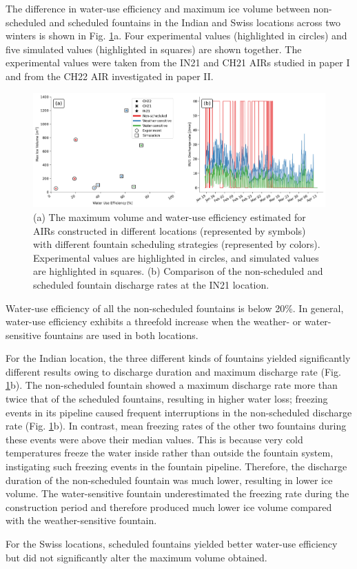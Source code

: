 The difference in water-use efficiency and maximum ice volume between non-scheduled and scheduled fountains in the
Indian and Swiss locations across two winters is shown in Fig. \ref{fig:wue}a. Four experimental values
(highlighted in circles) and five simulated values (highlighted in squares) are shown together. The
experimental values were taken from the IN21 and CH21 \ac{AIRs} studied in paper I and from the CH22 \ac{AIR} investigated in
paper II.

\begin{figure}[htb]
	\includegraphics[width=\textwidth]{figs/wue.png}

	\caption{(a) The maximum volume and water-use efficiency estimated for \ac{AIRs} constructed in different locations
		(represented by symbols) with different fountain scheduling strategies (represented by colors). Experimental
		values are highlighted in circles, and simulated values are highlighted in squares. (b) Comparison of
		the non-scheduled and scheduled fountain discharge rates at the IN21 location.}

	\label{fig:wue}
\end{figure}

Water-use efficiency of all the non-scheduled fountains is below 20\%. In general, water-use efficiency
exhibits a threefold increase when the weather- or water-sensitive fountains are used in both
locations.

For the Indian location, the three different kinds of fountains yielded significantly different results owing to discharge
duration and maximum discharge rate
(Fig. \ref{fig:wue}b). The non-scheduled fountain showed a maximum discharge rate more than twice that of
the scheduled fountains, resulting in higher water loss; freezing events in its pipeline caused frequent
interruptions in the non-scheduled discharge rate (Fig. \ref{fig:wue}b). In contrast, mean freezing
rates of the other two fountains during these events were above their median values. This is because very cold
temperatures freeze the water inside rather than outside the fountain system, instigating such freezing events in
the fountain pipeline. Therefore, the discharge duration of the non-scheduled fountain was much lower, resulting in
lower ice volume. The water-sensitive fountain underestimated the freezing rate during the construction period
and therefore produced much lower ice volume compared with the weather-sensitive fountain.

For the Swiss locations, scheduled fountains yielded better water-use efficiency but did not significantly alter
the maximum volume obtained.

